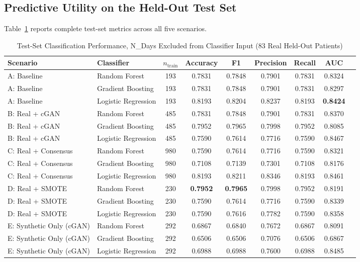 \documentclass[journal]{IEEEtran}
\begin{document}
\subsection{Predictive Utility on the Held-Out Test Set}

Table~\ref{tab:performance} reports complete test-set metrics across all five scenarios.

\begin{table}[t]
  \centering
  \caption{Test-Set Classification Performance, N\_Days Excluded from Classifier Input (83 Real Held-Out Patients)}
  \label{tab:performance}
  \begin{tabular}{llccccccc}
    \toprule
    Scenario & Classifier & $n_{\text{train}}$ & Accuracy & F1 & Precision & Recall & AUC \\
    \midrule
    A: Baseline       & Random Forest      & 193 & 0.7831 & 0.7848 & 0.7901 & 0.7831 & 0.8324 \\
    A: Baseline       & Gradient Boosting  & 193 & 0.7831 & 0.7848 & 0.7901 & 0.7831 & 0.8297 \\
    A: Baseline       & Logistic Regression& 193 & 0.8193 & 0.8204 & 0.8237 & 0.8193 & \textbf{0.8424} \\
    \midrule
    B: Real + cGAN   & Random Forest      & 485 & 0.7831 & 0.7848 & 0.7901 & 0.7831 & 0.8370 \\
    B: Real + cGAN   & Gradient Boosting  & 485 & 0.7952 & 0.7965 & 0.7998 & 0.7952 & 0.8085 \\
    B: Real + cGAN   & Logistic Regression& 485 & 0.7590 & 0.7614 & 0.7716 & 0.7590 & 0.8467 \\
    \midrule
    C: Real + Consensus & Random Forest    & 980 & 0.7590 & 0.7614 & 0.7716 & 0.7590 & 0.8321 \\
    C: Real + Consensus & Gradient Boosting& 980 & 0.7108 & 0.7139 & 0.7301 & 0.7108 & 0.8176 \\
    C: Real + Consensus & Logistic Regression & 980 & 0.8193 & 0.8211 & 0.8346 & 0.8193 & 0.8461 \\
    \midrule
    D: Real + SMOTE   & Random Forest      & 230 & \textbf{0.7952} & \textbf{0.7965} & 0.7998 & 0.7952 & 0.8191 \\
    D: Real + SMOTE   & Gradient Boosting  & 230 & 0.7590 & 0.7614 & 0.7716 & 0.7590 & 0.8339 \\
    D: Real + SMOTE   & Logistic Regression& 230 & 0.7590 & 0.7616 & 0.7782 & 0.7590 & 0.8358 \\
    \midrule
    E: Synthetic Only (cGAN) & Random Forest      & 292 & 0.6867 & 0.6840 & 0.7672 & 0.6867 & 0.8091 \\
    E: Synthetic Only (cGAN) & Gradient Boosting  & 292 & 0.6506 & 0.6506 & 0.7076 & 0.6506 & 0.6867 \\
    E: Synthetic Only (cGAN) & Logistic Regression& 292 & 0.6988 & 0.6988 & 0.7600 & 0.6988 & 0.8485 \\
    \bottomrule
  \end{tabular}
\end{table}
\end{document}
